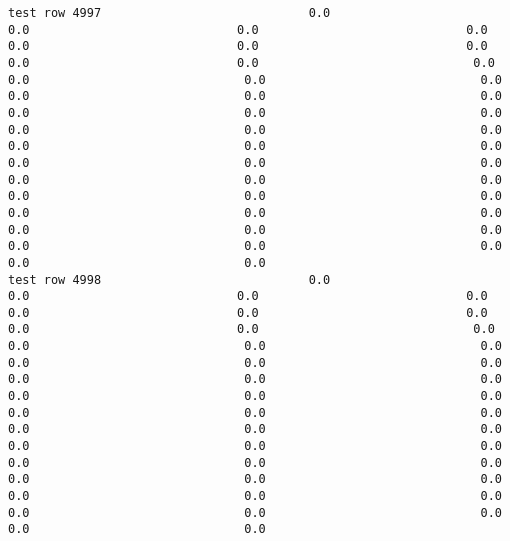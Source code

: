 \documentclass[11pt]{article}
\begin{document}
\begin{verbatim}
test row 4997                             0.0                             0.0                             0.0                             0.0                             0.0                             0.0                             0.0                             0.0                             0.0                              0.0                              0.0                              0.0                              0.0                              0.0                              0.0                              0.0                              0.0                              0.0                              0.0                              0.0                              0.0                              0.0                              0.0                              0.0                              0.0                              0.0                              0.0                              0.0                              0.0                              0.0                              0.0                              0.0                              0.0                              0.0                              0.0                              0.0                              0.0                              0.0                              0.0                              0.0                              0.0                              0.0                              0.0                              0.0                              0.0
test row 4998                             0.0                             0.0                             0.0                             0.0                             0.0                             0.0                             0.0                             0.0                             0.0                              0.0                              0.0                              0.0                              0.0                              0.0                              0.0                              0.0                              0.0                              0.0                              0.0                              0.0                              0.0                              0.0                              0.0                              0.0                              0.0                              0.0                              0.0                              0.0                              0.0                              0.0                              0.0                              0.0                              0.0                              0.0                              0.0                              0.0                              0.0                              0.0                              0.0                              0.0                              0.0                              0.0                              0.0                              0.0                              0.0

\end{verbatim}
\end{document}
